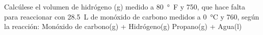 Calcúlese el volumen de hidrógeno (g) medido a \SI{80}{\degree F} y \SI{750}{\torr}, que hace falta para reaccionar con \SI{28,5}{\liter} de monóxido de carbono medidos a \SI{0}{\celsius} y \SI{760}{\torr}, según la reacción: Monóxido de carbono(g) + Hidrógeno(g) \ce{->} Propano(g) + Agua(l)
